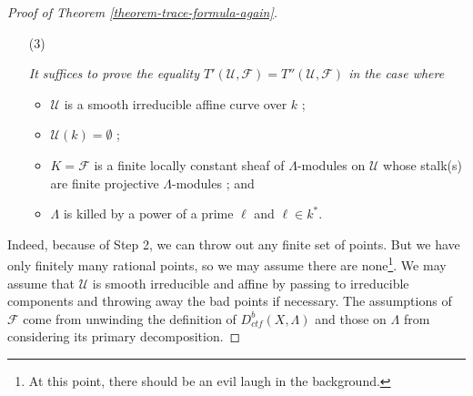 \begin{proof}[Proof of Theorem \ref{theorem-trace-formula-again}]
$$$$
\begin{enumerate}
\item[(3)]
{\it It suffices to prove the equality $T'(\mathcal{U}, \mathcal{F}) =
T''(\mathcal{U}, \mathcal{F})$ in the case where
\begin{itemize}
\item $\mathcal{U}$ is a smooth irreducible affine curve over $k$ ;
\item $\mathcal{U}(k) = \emptyset$ ;
\item $K=\mathcal{F}$ is a finite locally constant sheaf of $\Lambda$-modules
on $\mathcal{U}$ whose stalk(s) are finite projective $\Lambda$-modules ; and
\item $\Lambda$ is killed by a power of a prime $\ell$ and $\ell \in k^*$.
\end{itemize}
}
\end{enumerate}
Indeed, because of Step 2, we can throw out any finite set of points. But we
have only finitely many rational points, so we may assume there are
none\footnote{At this point, there should be an evil laugh in the background.}.
We may assume that $\mathcal{U}$ is smooth irreducible and affine by passing to
irreducible components and throwing away the bad points if necessary. The
assumptions of $\mathcal{F}$ come from unwinding the definition of
$D_{ctf}^b(X, \Lambda)$ and those on $\Lambda$ from considering its primary
decomposition.


\end{proof}
